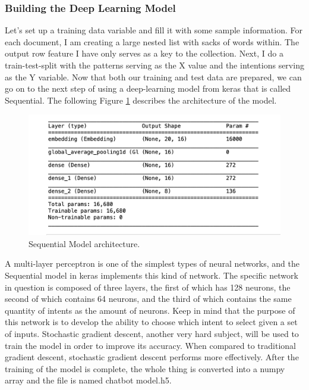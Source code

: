 \subsubsection{Building the Deep Learning Model}
Let's set up a training data variable and fill it with some sample information. For each document, I am creating a large nested list with sacks of words within. The output row feature I have only serves as a key to the collection. Next, I do a train-test-split with the patterns serving as the X value and the intentions serving as the Y variable. Now that both our training and test data are prepared, we can go on to the next step of using a deep-learning model from keras that is called Sequential. The following Figure \ref{fig:10} describes the architecture of the model.

\begin{figure}[!h]
	\centering
	\includegraphics[width=\textwidth]{deeplearning}
	\caption{Sequential Model architecture.}
	\label{fig:10}
\end{figure}

A multi-layer perceptron is one of the simplest types of neural networks, and the Sequential model in keras implements this kind of network. The specific network in question is composed of three layers, the first of which has 128 neurons, the second of which contains 64 neurons, and the third of which contains the same quantity of intents as the amount of neurons. Keep in mind that the purpose of this network is to develop the ability to choose which intent to select given a set of inputs. Stochastic gradient descent, another very hard subject, will be used to train the model in order to improve its accuracy. When compared to traditional gradient descent, stochastic gradient descent performs more effectively. After the training of the model is complete, the whole thing is converted into a numpy array and the file is named chatbot model.h5.

